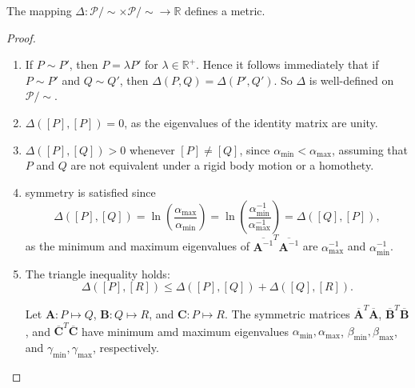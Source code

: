 \documentclass[10pt,a4paper]{amsart}
\begin{document}
\begin{Prop}\label{metric}
The mapping $\Delta: \mathcal{P}/\sim \times \mathcal{P}/\sim \to \mathbb{R}$ defines a metric.
\end{Prop}

\begin{proof} \hfill
\begin{enumerate}

	\item If $P \sim P'$, then $P = \lambda P'$ for $\lambda \in \mathbb{R^+}$. Hence it follows immediately that if $P \sim P'$ and $Q \sim Q'$, then $\Delta(P,Q)=\Delta(P',Q')$. So $\Delta$ is well-defined on $\mathcal{P}/\sim$.
	
    \item $\Delta([P],[P])=0$, as the eigenvalues of the identity matrix are unity.
    
  \item $\Delta([P],[Q]) > 0$ whenever $[P] \neq [Q]$, since $\alpha_{\min} < \alpha_{\max}$, assuming that $P$ and $Q$ are not equivalent under a rigid body motion or a homothety.

    \item symmetry is satisfied since
    \begin{equation*}
        \Delta([P], [Q]) = \ln \left(\frac{\alpha_{\max}}{\alpha_{\min}}\right) = \ln \left(\frac{\alpha_{\min}^{-1}}{\alpha_{\max}^{-1}}\right) = \Delta([Q], [P]),
    \end{equation*}
    as the minimum and maximum eigenvalues of $\overline{\mathbf{A}^{-1}}^T \overline{\mathbf{A}^{-1}}$ are $\alpha_{\max}^{-1}$ and $\alpha_{\min}^{-1}$.
    
     \item The triangle inequality holds:
\begin{equation*}
    \Delta([P], [R]) \leq \Delta([P], [Q]) + \Delta([Q], [R]).
\end{equation*}

    Let $\mathbf{A}: P \mapsto Q$, $\mathbf{B}: Q \mapsto R$, and $\mathbf{C}: P \mapsto R$. The symmetric matrices $\overline{\mathbf{A}}^T \overline{\mathbf{A}}$, $\overline{\mathbf{B}}^T \overline{\mathbf{B}}$, and $\overline{\mathbf{C}}^T \overline{\mathbf{C}}$ have minimum amd maximum eigenvalues $\alpha_{\min}, \alpha_{\max}$, $\beta_{\min}, \beta_{\max}$, and $\gamma_{\min}, \gamma_{\max}$, respectively.  


\end{enumerate}
\end{proof}
\end{document}
